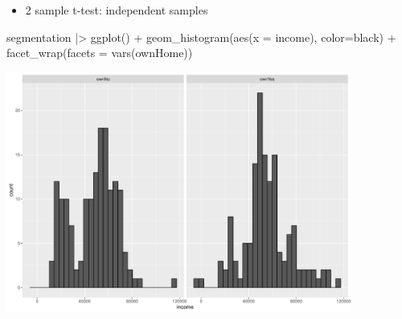 \documentclass[
  ignorenonframetext,
]{beamer}
\newenvironment{Shaded}{\begin{snugshade}}{\end{snugshade}}
\newcommand{\AttributeTok}[1]{\textcolor[rgb]{0.40,0.45,0.13}{#1}}
\newcommand{\FunctionTok}[1]{\textcolor[rgb]{0.28,0.35,0.67}{#1}}
\newcommand{\NormalTok}[1]{\textcolor[rgb]{0.00,0.23,0.31}{#1}}
\newcommand{\SpecialCharTok}[1]{\textcolor[rgb]{0.37,0.37,0.37}{#1}}
\newcommand{\StringTok}[1]{\textcolor[rgb]{0.13,0.47,0.30}{#1}}
\providecommand{\tightlist}{%
  \setlength{\itemsep}{0pt}\setlength{\parskip}{0pt}}\usepackage{longtable,booktabs,array}
\begin{document}
\begin{frame}[fragile]{}
\label{section-14}
\begin{itemize}
\tightlist
\item
  2 sample t-test: independent samples
\end{itemize}

\tiny

\begin{Shaded}
\begin{Highlighting}[]
\NormalTok{segmentation }\SpecialCharTok{|\textgreater{}} \FunctionTok{ggplot}\NormalTok{() }\SpecialCharTok{+} 
  \FunctionTok{geom\_histogram}\NormalTok{(}\FunctionTok{aes}\NormalTok{(}\AttributeTok{x =}\NormalTok{ income), }\AttributeTok{color=}\StringTok{\textquotesingle{}black\textquotesingle{}}\NormalTok{) }\SpecialCharTok{+} 
  \FunctionTok{facet\_wrap}\NormalTok{(}\AttributeTok{facets =} \FunctionTok{vars}\NormalTok{(ownHome))}
\end{Highlighting}
\end{Shaded}

\begin{center}
\includegraphics[width=0.85\textwidth,height=\textheight]{006_comparing_groups_statistical_tests_files/figure-beamer/unnamed-chunk-14-1.pdf}
\end{center}
\end{frame}
\end{document}
